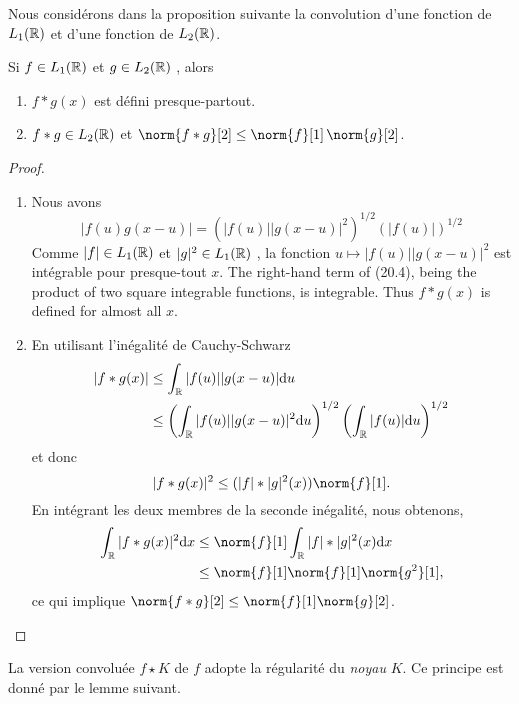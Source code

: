 Nous consid\'erons dans la proposition suivante la convolution d'une fonction de $L_1(\mathbb{R})$
 et d'une fonction de $L_{2}(\mathbb{R})$.
\begin{proposition}
Si $f\in L_1(\mathbb{R})$ et $g\in L_{2}(\mathbb{R})$ , alors
\begin{enumerate}[label=(\roman*)]
\item $f*g(x)$ est d\'efini presque-partout.
\item  $f*g  \in L_{2}(\mathbb{R})$  et $\norm{f*g}[2]\leq \norm{f}[1] \, \norm{g}[2]$.
\end{enumerate}
\end{proposition}
\begin{proof}
\begin{enumerate}[label=(\roman*), wide=0pt, labelindent=\parindent]
\item Nous avons
\begin{equation}
|f(u)g(x-u)|=(|f(u)||g(x-u)|^{2})^{1/2}(|f(u)|)^{1/2}
\end{equation}
Comme $|f|\in L_1(\mathbb{R})$ et $|g|^{2}\in L_1(\mathbb{R})$ , la fonction $u\mapsto|f(u)||g(x-u)|^{2}$ est int\'egrable pour presque-tout
$x$. The right-hand term of (20.4), being the product of two square integrable functions, is integrable. Thus $f*g(x)$ is defined for almost all $x.$

\item En utilisant l'in\'egalit\'e de Cauchy-Schwarz
\begin{align*}
|f*g(x)| &\leq\int_{\mathbb{R}}|f(u)||g(x-u)|\mathrm{d} u \\
&\leq \left(\int_{\mathbb{R}}|f(u)||g(x-u)|^{2}\mathrm{d} u \right)^{1/2} \left(\int_{\mathbb{R}}|f(u)|\mathrm{d} u \right)^{1/2}
\end{align*}
et donc
$$
|f*g(x)|^{2}\leq(|f|*|g|^{2}(x))\norm{f}[1].
$$
En int\'egrant les deux membres de la seconde in\'egalit\'e, nous obtenons,
\begin{align*}
\int_{\rset}|f*g(x)|^{2}\rmd x &\leq \norm{f}[1] \int_{\rset}|f|*|g|^{2}(x)\rmd x \\
&\leq\norm{f}[1] \norm{f}[1] \norm{g^{2}}[1],
\end{align*}
ce qui implique $\norm{f*g}[2] \leq \norm{f}[1] \norm{g}[2]$.
\end{enumerate}
\end{proof}
La version convolu{\'e}e $f\star K$ de
$f$ adopte la r{\'e}gularit{\'e} du \emph{noyau} $K$. Ce principe est donn{\'e} par le
lemme suivant.

